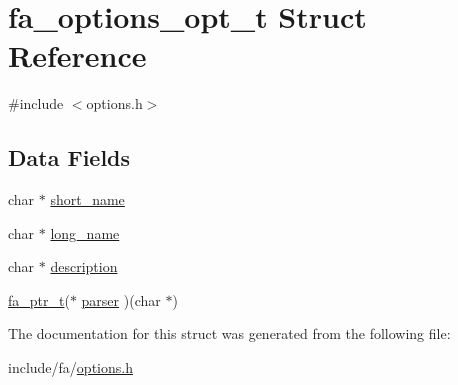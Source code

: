 \hypertarget{structfa__options__opt__t}{\section{fa\-\_\-options\-\_\-opt\-\_\-t Struct Reference}
\label{structfa__options__opt__t}
}


{\ttfamily \#include $<$options.\-h$>$}

\subsection*{Data Fields}
\begin{DoxyCompactItemize}
\item 
char $\ast$ \hyperlink{group___fa_gaa5a69044f6986702f27bdd6c692bfdef}{short\-\_\-name}
\item 
char $\ast$ \hyperlink{group___fa_ga3011e3bf089e48ad6362143c64451008}{long\-\_\-name}
\item 
char $\ast$ \hyperlink{group___fa_gaae63b20d7b9855d30e3e0824d4c19a44}{description}
\item 
\hyperlink{group___fa_ga915ddeae99ad7568b273d2b876425197}{fa\-\_\-ptr\-\_\-t}($\ast$ \hyperlink{group___fa_ga391d8b88a4c50f7e1ae285bbe43bff02}{parser} )(char $\ast$)
\end{DoxyCompactItemize}


The documentation for this struct was generated from the following file\-:\begin{DoxyCompactItemize}
\item 
include/fa/\hyperlink{options_8h}{options.\-h}\end{DoxyCompactItemize}
